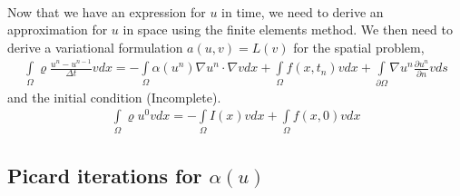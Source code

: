 \documentclass[11pt,a4paper]{article}
\begin{document}
\paragraph*{}
Now that we have an expression for $u$ in time, we need to derive an approximation for $u$ in space using the finite elements method. We then need to derive a variational formulation $a(u,v)=L(v)$ for the spatial problem,
\begin{align*}
\int\limits_\Omega \varrho \frac{u^n-u^{n-1}}{\Delta t}v dx = 
- \int\limits_\Omega \alpha(u^n)\nabla u^n \cdot \nabla vdx + \int\limits_\Omega f(x, t_n)vdx + 
\int\limits_{\partial\Omega}\nabla u^n \frac{\partial u^n}{\partial n} vds
\end{align*}
and the initial condition (Incomplete).
\begin{align*}
\int\limits_\Omega \varrho u^0 v dx = 
- \int\limits_\Omega I(x) vdx + \int\limits_\Omega f(x, 0)vdx
\end{align*}

\subsection{Picard iterations for $\alpha(u)$}
\end{document}
